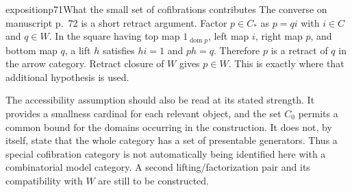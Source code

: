\begin{dcomment}{exposition}{p71}{What the small set of cofibrations contributes}
The converse on manuscript p.~72 is a short retract argument. Factor $p\in C_*$ as $p=q i$ with $i\in C$ and $q\in W$. In the square having top map $1_{\operatorname{dom}p}$, left map $i$, right map $p$, and bottom map $q$, a lift $h$ satisfies $hi=1$ and $ph=q$. Therefore $p$ is a retract of $q$ in the arrow category. Retract closure of $W$ gives $p\in W$. This is exactly where that additional hypothesis is used.

The accessibility assumption should also be read at its stated strength. It provides a smallness cardinal for each relevant object, and the set $C_0$ permits a common bound for the domains occurring in the construction. It does not, by itself, state that the whole category has a set of presentable generators. Thus a special cofibration category is not automatically being identified here with a combinatorial model category. A second lifting/factorization pair and its compatibility with $W$ are still to be constructed.
\end{dcomment}

